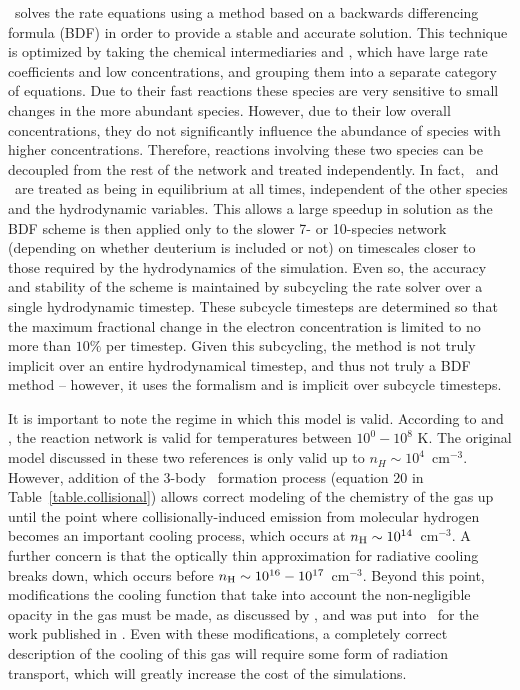 \enzo\ solves the rate equations using a method based on a backwards
differencing formula (BDF) in order to provide a stable and accurate
solution. This technique is optimized by taking the chemical
intermediaries \Hm and \HHp, which have large rate coefficients
and low concentrations, and grouping them into a separate category of
equations.  Due to their fast reactions these species are very
sensitive to small changes in the more abundant species.  However, due
to their low overall concentrations, they do not significantly
influence the abundance of species with higher concentrations.
Therefore, reactions involving these two species can be decoupled from
the rest of the network and treated independently.  In fact, \Hm~and
\HHp~are treated as being in equilibrium at all times, independent
of the other species and the hydrodynamic variables.  This allows a
large speedup in solution as the BDF scheme is then applied only to
the slower 7- or 10-species network (depending on whether deuterium is
included or not) on timescales closer to those required by the
hydrodynamics of the simulation.  Even so, the accuracy and stability
of the scheme is maintained by subcycling the rate solver over a
single hydrodynamic timestep.  These subcycle timesteps are determined
so that the maximum fractional change in the electron concentration is
limited to no more than $10\%$ per timestep.  Given this subcycling,
the method is not truly implicit over an entire hydrodynamical
timestep, and thus not truly a BDF method -- however, it uses the
formalism and is implicit over subcycle timesteps.


It is important to note the regime in which this model is valid.
According to \citet{abel97} and \citet{anninos97},
the reaction network is valid for temperatures between $10^0 - 10^8$
K.  The original model discussed in these two references is only valid
up to $n_H \sim 10^4$~cm$^{-3}$.  However, addition of the 3-body
\HH~formation process (equation 20 in Table~\ref{table.collisional})
allows correct modeling of the chemistry of the gas up until the point
where collisionally-induced emission from molecular hydrogen becomes
an important cooling process, which occurs at $n_{\rm H} \sim
10^{14}$~cm$^{-3}$.  A further concern is that the optically thin
approximation for radiative cooling breaks down, which occurs before
$n_{\rm H} \sim 10^{16} - 10^{17}$~cm$^{-3}$.  Beyond this point,
modifications the cooling function that take into account the
non-negligible opacity in the gas must be made, as discussed by
\citet{2004MNRAS.348.1019R}, and was put into \enzo\ for the work
published in \citep{2009Sci...325..601T,2009PhDT.........5T}.  Even
with these modifications, a completely correct description of the
cooling of this gas will require some form of radiation transport,
which will greatly increase the cost of the simulations.

